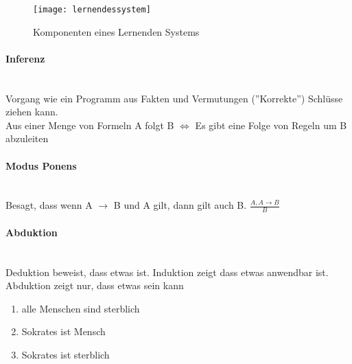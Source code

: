 \begin{figure}[!h]
  \centering
  \texttt{[image: lernendessystem]}
  \caption{Komponenten eines Lernenden Systems}
\end{figure}

\paragraph{Inferenz}\mbox{} \\
Vorgang wie ein Programm aus Fakten und Vermutungen (''Korrekte'') Schlüsse
ziehen kann. \\
Aus einer Menge von Formeln A folgt B $\Leftrightarrow$ Es gibt eine Folge von Regeln
um B abzuleiten

\paragraph{Modus Ponens}\mbox{} \\
 Besagt, dass wenn A $\rightarrow$ B und A gilt,
dann gilt auch B. $\frac{A, A \rightarrow B}{B}$

\paragraph{Abduktion} \mbox{} \\
Deduktion beweist, dass etwas ist. Induktion zeigt dass etwas anwendbar ist.
Abduktion zeigt nur, dass etwas sein kann
\begin{enumerate}
    \item alle Menschen sind sterblich
    \item Sokrates ist Mensch
    \item Sokrates ist sterblich
\end{enumerate}
